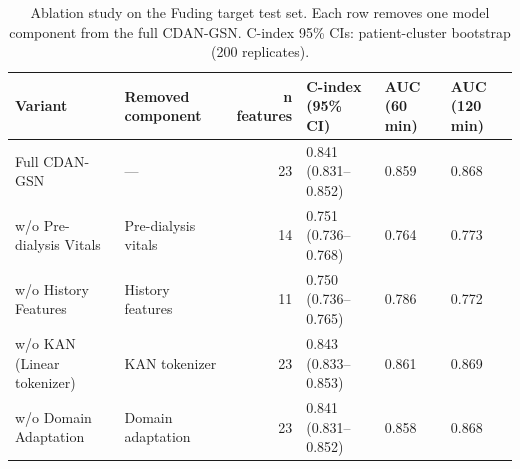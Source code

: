\begin{table}
\caption{Ablation study on the Fuding target test set. Each row removes one model component from the full CDAN-GSN. C-index 95\% CIs: patient-cluster bootstrap (200 replicates).}
\label{tab:ablation}
\begin{tabular}{llrlll}
\toprule
Variant & Removed component & n features & C-index (95\% CI) & AUC (60 min) & AUC (120 min) \\
\midrule
Full CDAN-GSN & — & 23 & 0.841 (0.831–0.852) & 0.859 & 0.868 \\
w/o Pre-dialysis Vitals & Pre-dialysis vitals & 14 & 0.751 (0.736–0.768) & 0.764 & 0.773 \\
w/o History Features & History features & 11 & 0.750 (0.736–0.765) & 0.786 & 0.772 \\
w/o KAN (Linear tokenizer) & KAN tokenizer & 23 & 0.843 (0.833–0.853) & 0.861 & 0.869 \\
w/o Domain Adaptation & Domain adaptation & 23 & 0.841 (0.831–0.852) & 0.858 & 0.868 \\
\bottomrule
\end{tabular}
\end{table}
